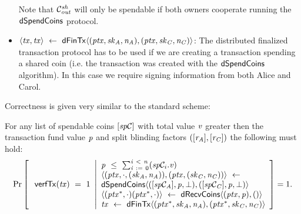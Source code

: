 \begin{definition}
\begin{itemize}
        Note that $\mathcal{C}_{\mathit{out}}^{\mathit{sh}}$ will only be spendable if both owners cooperate running the $\mathsf{dSpendCoins}$ protocol.
        \item $\langle \mathit{tx}, \mathit{tx} \rangle ~\leftarrow~ \mathsf{dFinTx} \langle(\mathit{ptx},\mathit{sk}_{\mathit{A}},\mathit{\mathit{n}_{\mathit{A}}}),(\mathit{ptx},\mathit{sk}_{\mathit{C}},\mathit{\mathit{n}_{\mathit{C}}})\rangle$: The distributed finalized transaction protocol has to be used if we are creating a transaction spending a shared coin (i.e. the transaction was created with the $\mathsf{dSpendCoins}$ algorithm).
        In this case we require signing information from both Alice and Carol.
    \end{itemize}
\end{definition}

Correctness is given very similar to the standard scheme:

\begin{definition}
    \label{def:atom:ext-tx-scheme-correctness}
    For any list of spendable coins $[\mathit{sp}\mathcal{C}]$ with total value $\mathit{v}$ greater then the transaction fund value $\mathit{p}$ and split blinding factors $([\mathit{r}_{\mathit{A}}], [\mathit{r}_{\mathit{C}}])$ the following must hold:
    \[
        \Pr\left[
        \begin{array}{c}
            \: \mathsf{verfTx}(\mathit{tx}) ~=~ 1
        \end{array}
        \middle\vert
        \begin{array}{l}
            \mathit{p} ~\leq~ \sum_{\mathit{i} ~:=~ 0}^{\mathit{i} ~<~ \mathit{n}}(\mathit{sp}\mathcal{C}_{i}.\mathit{v}) \\
            \langle (\mathit{ptx}, \cdot, (\mathit{sk}_{\mathit{A}}, \mathit{\mathit{n}_{\mathit{A}}})), (\mathit{ptx}, (\mathit{sk}_{\mathit{C}}, \mathit{\mathit{n}_{\mathit{C}}})) \rangle ~\leftarrow~ \\
            \mathsf{dSpendCoins} \langle ([\mathit{sp}\mathcal{C}_{\mathit{A}}],\mathit{p},\bot), ([\mathit{sp}\mathcal{C}_{\mathit{C}}],\mathit{p},\bot) \rangle \\
            \langle (\mathit{ptx}^*, \cdot)(\mathit{ptx}^*, \cdot) \rangle ~\leftarrow~ \mathsf{dRecvCoins} \langle(\mathit{ptx},\mathit{p}), () \rangle \\
            \mathit{tx} ~\leftarrow~ \mathsf{dFinTx} \langle(\mathit{ptx}^*,\mathit{sk}_{\mathit{A}},\mathit{\mathit{n}_{\mathit{A}}}),(\mathit{ptx}^*,\mathit{sk}_{\mathit{C}},\mathit{\mathit{n}_{\mathit{C}}})\rangle
        \end{array}
        \right]=1.
    \]
\end{definition}



